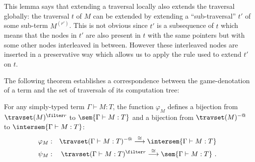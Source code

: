 This lemma says that extending a traversal locally also extends the traversal globally: the traversal $t$ of $M$ can be extended by extending a ``sub-traversal'' $t'$ of some sub-term $M^{(r')}$.
This is not obvious since $t'$ is a subsequence of $t$ which means that
the nodes in $t'$ are also present in $t$ with the same pointers but with some other nodes interleaved in between. However these interleaved nodes are inserted in a preservative way which allows us to apply the rule used to extend $t'$ on $t$.
\bigskip

The following theorem establishes a correspondence between the
game-denotation of a term and the set of traversals of its
computation tree:
\begin{theorem}
\label{thm:correspondence}
 For any simply-typed term $\Gamma \vdash M :T$,
the function $\varphi_M$ defines a bijection from $\travset(M)^{\filter
r}$ to $\sem{\Gamma \vdash M : T}$ and a bijection from
$\travset(M)^{-@}$ to $\intersem{\Gamma \vdash M : T}$:
\begin{eqnarray*}
 \varphi_M  &:& \travset(\Gamma \vdash M : T)^{-@} \stackrel{\cong}{\longrightarrow} \intersem{\Gamma \vdash M :T} \\
 \psi_M  &:& \travset(\Gamma \vdash M : T)^{\filter r} \stackrel{\cong}{\longrightarrow} \sem{\Gamma \vdash M :T} \ .
\end{eqnarray*}

\end{theorem}


